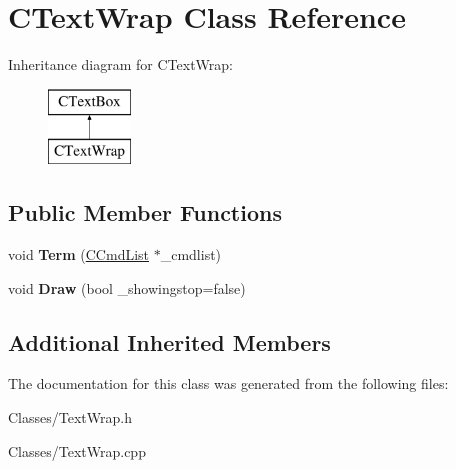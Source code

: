\hypertarget{class_c_text_wrap}{}\section{C\+Text\+Wrap Class Reference}
\label{class_c_text_wrap}
Inheritance diagram for C\+Text\+Wrap\+:\begin{figure}[H]
\begin{center}
\leavevmode
\includegraphics[height=2.000000cm]{class_c_text_wrap}
\end{center}
\end{figure}
\subsection*{Public Member Functions}
\begin{DoxyCompactItemize}
\item 
void {\bfseries Term} (\hyperlink{class_c_cmd_list}{C\+Cmd\+List} $\ast$\+\_\+cmdlist)\hypertarget{class_c_text_wrap_aa1fa97483e6a27ae37833d93de0775d8}{}\label{class_c_text_wrap_aa1fa97483e6a27ae37833d93de0775d8}

\item 
void {\bfseries Draw} (bool \+\_\+showingstop=false)\hypertarget{class_c_text_wrap_ac4347cc9888d7b72704be3d4d5da6c0a}{}\label{class_c_text_wrap_ac4347cc9888d7b72704be3d4d5da6c0a}

\end{DoxyCompactItemize}
\subsection*{Additional Inherited Members}


The documentation for this class was generated from the following files\+:\begin{DoxyCompactItemize}
\item 
Classes/Text\+Wrap.\+h\item 
Classes/Text\+Wrap.\+cpp\end{DoxyCompactItemize}
